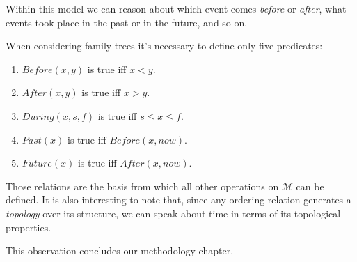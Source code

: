     Within this model we can reason about which event comes \textit{before} or \textit{after}, what events took place in the past or
    in the future, and so on.

    When considering family trees it's necessary to define only five predicates:
    \begin{enumerate}
        \item{$Before(x, y)$ is true iff $x < y$.}
        \item{$After(x, y)$ is true iff $x > y$.}
        \item{$During(x, s, f)$ is true iff $s \leqslant x \leqslant f$.}
        \item{$Past(x)$ is true iff $Before(x, now)$.}
        \item{$Future(x)$ is true iff $After(x, now)$.}
    \end{enumerate}
    Those relations are the basis from which all other operations on $\mathcal{M}$ can be defined. It is also interesting to note
    that, since any ordering relation generates a \textit{topology} over its structure, we can speak about time in terms of its
    topological properties.

    This observation concludes our methodology chapter.
